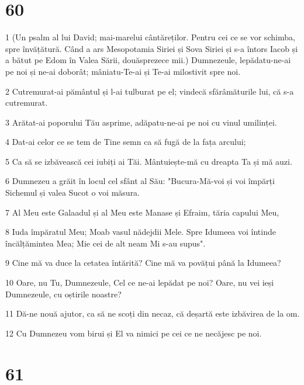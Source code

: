 \chapter{60}

\par 1 (Un psalm al lui David; mai-marelui cântăreților. Pentru cei ce se vor schimba, spre învățătură. Când a ars Mesopotamia Siriei și Sova Siriei și s-a întors Iacob și a bătut pe Edom în Valea Sării, douăsprezece mii.) Dumnezeule, lepădatu-ne-ai pe noi și ne-ai doborât; mâniatu-Te-ai și Te-ai milostivit spre noi.
\par 2 Cutremurat-ai pământul și l-ai tulburat pe el; vindecă sfărâmăturile lui, că s-a cutremurat.
\par 3 Arătat-ai poporului Tău asprime, adăpatu-ne-ai pe noi cu vinul umilinței.
\par 4 Dat-ai celor ce se tem de Tine semn ca să fugă de la fața arcului;
\par 5 Ca să se izbăvească cei iubiți ai Tăi. Mântuiește-mă cu dreapta Ta și mă auzi.
\par 6 Dumnezeu a grăit în locul cel sfânt al Său: "Bucura-Mă-voi și voi împărți Sichemul și valea Sucot o voi măsura.
\par 7 Al Meu este Galaadul și al Meu este Manase și Efraim, tăria capului Meu,
\par 8 Iuda împăratul Meu; Moab vasul nădejdii Mele. Spre Idumeea voi întinde încălțămintea Mea; Mie cei de alt neam Mi s-au supus".
\par 9 Cine mă va duce la cetatea întărită? Cine mă va povățui până la Idumeea?
\par 10 Oare, nu Tu, Dumnezeule, Cel ce ne-ai lepădat pe noi? Oare, nu vei ieși Dumnezeule, cu oștirile noastre?
\par 11 Dă-ne nouă ajutor, ca să ne scoți din necaz, că deșartă este izbăvirea de la om.
\par 12 Cu Dumnezeu vom birui și El va nimici pe cei ce ne necăjesc pe noi.

\chapter{61}

